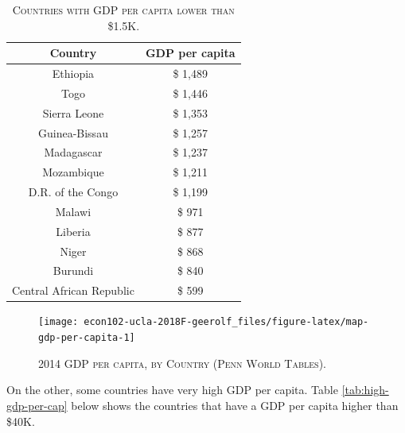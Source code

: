 \documentclass[]{book}
\begin{document}
\begin{table}[t]

\caption{\label{tab:low-gdp-per-cap}\textsc{Countries with GDP per capita lower than
\$1.5K.}}
\centering
\begin{tabular}{cc}
\toprule
Country & GDP per capita\\
\midrule
Ethiopia & \$ 1,489\\
Togo & \$ 1,446\\
Sierra Leone & \$ 1,353\\
Guinea-Bissau & \$ 1,257\\
Madagascar & \$ 1,237\\
\addlinespace
Mozambique & \$ 1,211\\
D.R. of the Congo & \$ 1,199\\
Malawi & \$ 971\\
Liberia & \$ 877\\
Niger & \$ 868\\
\addlinespace
Burundi & \$ 840\\
Central African Republic & \$ 599\\
\bottomrule
\end{tabular}
\end{table}




\begin{figure}

{\centering \texttt{[image: econ102-ucla-2018F-geerolf\_files/figure-latex/map-gdp-per-capita-1]} 

}

\caption{\textsc{2014 GDP per capita, by Country (Penn
World Tables)}.}\label{fig:map-gdp-per-capita}
\end{figure}

On the other, some countries have very high GDP per capita. Table
\ref{tab:high-gdp-per-cap} below shows the countries that have a GDP per
capita higher than \$40K.
\end{document}
